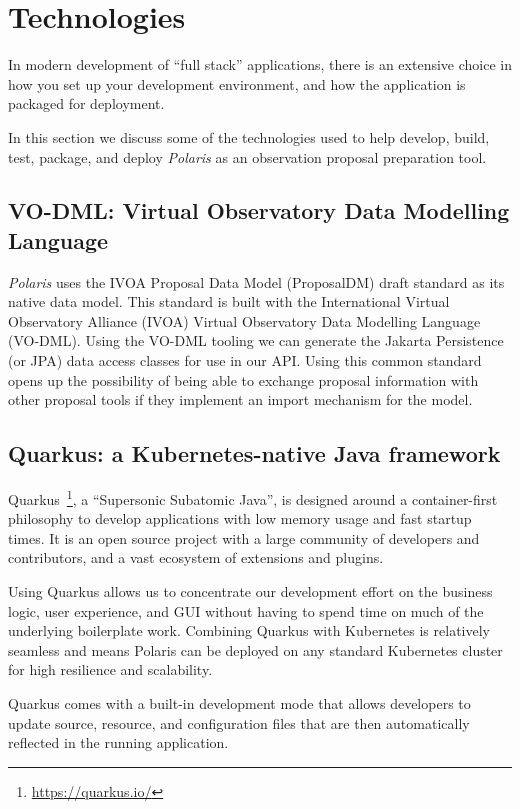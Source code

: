 \documentclass[11pt,twoside]{article}
\begin{document}
\section{Technologies}\label{sec:technologies}

In modern development of ``full stack'' applications, there is an extensive choice in how you set up your
development environment, and how the application is packaged for deployment.

In this section we discuss some of the technologies used to help develop, build, test, package, and deploy
\emph{Polaris} as an observation proposal preparation tool.

\subsection{VO-DML: Virtual Observatory Data Modelling Language}\label{subsec:vodml}

\emph{Polaris} uses the IVOA Proposal Data Model (ProposalDM) draft standard as its native data model.
This standard is built with the International Virtual Observatory Alliance (IVOA) Virtual
Observatory Data Modelling Language (VO-DML).
Using the VO-DML tooling we can generate the Jakarta Persistence (or JPA) data access classes for use in our API\@.
Using this common standard opens up the possibility of being able to exchange proposal information with
other proposal tools if they implement an import mechanism for the model.


\subsection{Quarkus: a Kubernetes-native Java framework}\label{subsec:quarkus}

Quarkus~\footnote{\url{https://quarkus.io/}}, a ``Supersonic Subatomic Java'', is designed around a
container-first philosophy to develop applications with low memory usage and fast startup times.
It is an open source project with a large community of developers and contributors, and a vast ecosystem
of extensions and plugins.

Using Quarkus allows us to concentrate our development effort on the business logic, user experience, and GUI
without having to spend time on much of the underlying boilerplate work.
Combining Quarkus with Kubernetes is relatively seamless and means Polaris can be deployed on any standard
Kubernetes cluster for high resilience and scalability.

Quarkus comes with a built-in development mode that allows developers to update source, resource, and
configuration files that are then automatically reflected in the running application.
\end{document}
